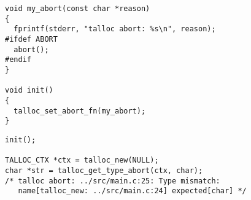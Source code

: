 \begin{lstlisting}[caption={Custom abort function}]
void my_abort(const char *reason)
{
  fprintf(stderr, "talloc abort: %s\n", reason);
#ifdef ABORT
  abort();
#endif
}

void init()
{
  talloc_set_abort_fn(my_abort);
}
\end{lstlisting}

\begin{lstlisting}[caption={Sample output}]
init();

TALLOC_CTX *ctx = talloc_new(NULL);
char *str = talloc_get_type_abort(ctx, char);
/* talloc abort: ../src/main.c:25: Type mismatch: 
   name[talloc_new: ../src/main.c:24] expected[char] */
\end{lstlisting}

%
